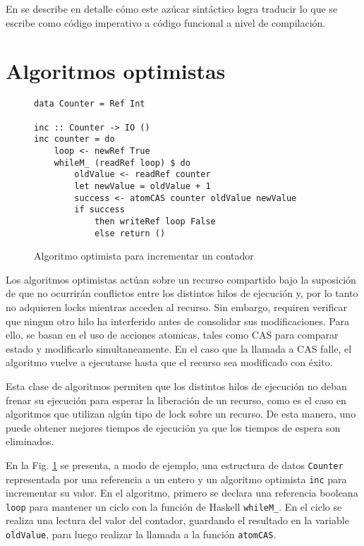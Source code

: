 En \cite{do-notation} se describe en detalle cómo este azúcar sintáctico logra traducir lo que se escribe como código imperativo a código funcional a nivel de compilación.

\section{Algoritmos optimistas}\label{sec:lockfree}
\begin{figure}[t]
\begin{verbatim}
data Counter = Ref Int

inc :: Counter -> IO ()
inc counter = do
    loop <- newRef True
    whileM_ (readRef loop) $ do
        oldValue <- readRef counter
        let newValue = oldValue + 1
        success <- atomCAS counter oldValue newValue
        if success
            then writeRef loop False
            else return ()
\end{verbatim}
\caption{Algoritmo optimista para incrementar un contador}
\label{fig:lockfree-counter-example}
\end{figure}

Los algoritmos optimistas actúan sobre un recurso compartido bajo la suposición de que no ocurrirán conflictos entre los distintos hilos de ejecución y, por lo tanto no adquieren locks mientras acceden al recurso. Sin embargo, requiren verificar que ningun otro hilo ha interferido antes de consolidar sus modificaciones. Para ello, se basan en el uso de acciones atomicas, tales como CAS para comparar estado y modificarlo simultaneamente.
En el caso que la llamada a CAS falle, el algoritmo vuelve a ejecutarse hasta que el recurso sea modificado con éxito.

Esta clase de algoritmos permiten que los distintos hilos de ejecución no deban frenar su ejecución para esperar la liberación de un recurso, como es el caso en algoritmos que utilizan algún tipo de lock sobre un recurso.
De esta manera, uno puede obtener mejores tiempos de ejecución ya que los tiempos de espera son eliminados.

En la Fig. \ref{fig:lockfree-counter-example} se presenta, a modo de ejemplo, una estructura de datos \texttt{Counter} representada por una referencia a un entero y un algoritmo optimista \texttt{inc} para incrementar su valor.
En el algoritmo, primero se declara una referencia booleana \texttt{loop} para mantener un ciclo con la función de Haskell \texttt{whileM\_}.
En el ciclo se realiza una lectura del valor del contador, guardando el resultado en la variable \texttt{oldValue}, para luego realizar la llamada a la función \texttt{atomCAS}.

